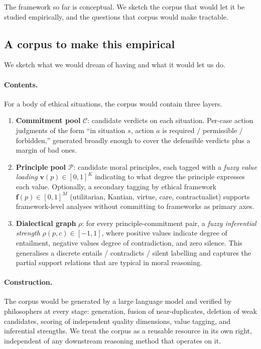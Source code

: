 \documentclass{article}
\begin{document}
The framework so far is conceptual. We sketch the corpus that would let
it be studied empirically, and the questions that corpus would make
tractable.

\subsection{A corpus to make this empirical}
\label{sec:corpus}

We sketch what we would dream of having and what it would let us do.

\paragraph{Contents.} For a body of ethical situations, the corpus would
contain three layers.

\begin{enumerate}[leftmargin=*, itemsep=2pt]
  \item \textbf{Commitment pool} $\mathcal{C}$: candidate verdicts on each
    situation. Per-case action judgments of the form ``in situation $s$,
    action $a$ is required / permissible / forbidden,'' generated broadly
    enough to cover the defensible verdicts plus a margin of bad ones.
  \item \textbf{Principle pool} $\mathcal{P}$: candidate moral principles,
    each tagged with a \emph{fuzzy value loading} $\boldsymbol{v}(p) \in [0,1]^K$
    indicating to what degree the principle expresses each value. Optionally,
    a secondary tagging by ethical framework $\boldsymbol{f}(p) \in [0, 1]^M$
    (utilitarian, Kantian, virtue, care, contractualist) supports
    framework-level analyses without committing to frameworks as primary
    axes.
  \item \textbf{Dialectical graph} $\rho$: for every principle-commitment
    pair, a \emph{fuzzy inferential strength}
    $\rho(p, c) \in [-1, 1]$, where positive values indicate degree of
    entailment, negative values degree of contradiction, and zero
    silence. This generalises a discrete entails / contradicts / silent
    labelling and captures the partial support relations that are typical
    in moral reasoning.
\end{enumerate}

\paragraph{Construction.} The corpus would be generated by a large language
model and verified by philosophers at every stage: generation, fusion of
near-duplicates, deletion of weak candidates, scoring of independent
quality dimensions, value tagging, and inferential strengths. We treat the
corpus as a reusable resource in its own right, independent of any
downstream reasoning method that operates on it.
\end{document}
